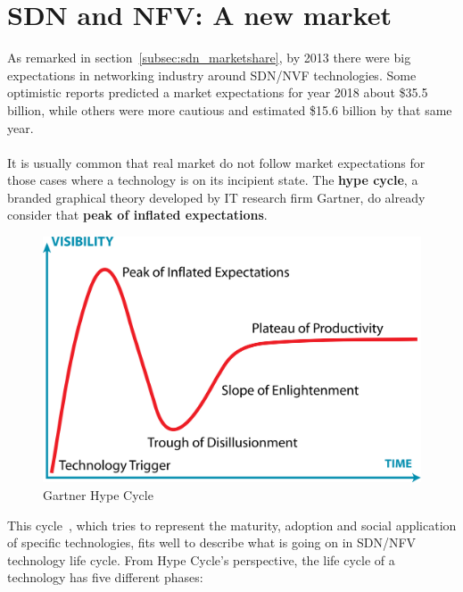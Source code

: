 \documentclass[a4paper, 12pt]{book}
\begin{document}
\section{SDN and NFV: A new market}
\label{sec:odlnewmarket}

As remarked in section~\ref{subsec:sdn_marketshare}, by 2013 there were big expectations in networking industry around SDN/NVF technologies. Some optimistic reports predicted a market expectations for year 2018 about \$35.5 billion, while others were more cautious and estimated \$15.6 billion by that same year.\\
\\
It is usually common that real market do not follow market expectations for those cases where a technology is on its incipient state. The \textbf{hype cycle}, a branded graphical theory developed by IT research firm Gartner, do already consider that \textbf{peak of inflated expectations}.
\begin{center}
 \begin{figure}[H]
 \begin{center}
   \includegraphics[width=15cm]{img/hype-cycle-00.png}
   \caption{Gartner Hype Cycle}
   \label{fig:gartner_hype_cyle}
 \end{center}
 \end{figure}
\end{center}
This cycle~\cite{HypeCycle}, which tries to represent the maturity, adoption and social application of specific technologies, fits well to describe what is going on in SDN/NFV technology life cycle. From Hype Cycle's perspective, the life cycle of a technology has five different phases:
\end{document}
